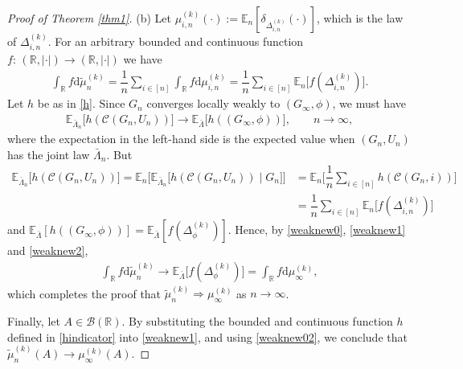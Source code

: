 \documentclass[11pt]{article}
\numberwithin{equation}{section}
\theoremstyle{plain}
\newcommand{\R}{\mathbb R}
\newcommand{\dd}{\mathrm{d}}
\newcommand{\weak}{\Longrightarrow}
\newcommand{\E}{\mathbb E}
\begin{document}
\begin{proof}[Proof of Theorem \ref{thm1}]
\medskip\noindent
(b) Let $\mu_{i,n}^{(k)}(\cdot):=\E_{n}[\delta_{\Delta_{i,n}^{(k)}}(\cdot)]$, which is the law of $\Delta_{i,n}^{(k)}$. For an arbitrary bounded and continuous function $f\colon\,(\R,\vert\cdot\vert) \to (\R,\vert\cdot\vert)$ we have
\begin{align}
\label{weaknew0}
\int_\R f \dd\tilde{\mu}_{n}^{(k)} = \dfrac{1}{n} \sum_{i \in [n]} \int_\R f \dd\mu_{i,n}^{(k)}
=\dfrac{1}{n}\sum_{i \in [n]} \E_{n}\big[f(\Delta_{i,n}^{(k)})\big].
\end{align}
Let $h$ be as in \eqref{h}. Since $G_{n}$ converges locally weakly to $(G_{\infty},\phi)$, we must have 
\begin{align}
\label{weaknew1}
\E_{\bar{\Lambda}_{n}}\big[h(\mathscr{C}(G_{n},U_{n}))\big] \to \E_{\bar{\Lambda}}\big[h((G_{\infty},\phi))\big],
\qquad n\to\infty,
\end{align}
where the expectation in the left-hand side is the expected value when $(G_{n},U_{n})$ has the joint law $\bar{\Lambda}_{n}$. But 
\begin{align}
\E_{\bar{\Lambda}_{n}}\big[h(\mathscr{C}(G_{n},U_{n}))\big] 
= \E_{n}\Big[\E_{\bar{\Lambda}_{n}}\big[h(\mathscr{C}(G_{n},U_{n}))\mid G_{n}\big]\Big]
&= \E_{n}\Big[\dfrac{1}{n}\sum_{i \in [n]}h(\mathscr{C}(G_{n},i))\Big] \label{weaknew02}\\
&=\dfrac{1}{n}\sum_{i \in [n]} \E_{n}\big[f(\Delta_{i,n}^{(k)})\big] \label{weaknew2}
\end{align}
and $\E_{\bar{\Lambda}}[h((G_{\infty},\phi))]=\E_{\bar{\Lambda}}[f(\Delta_{\phi}^{(k)})]$. Hence, by \eqref{weaknew0}, \eqref{weaknew1} and \eqref{weaknew2},
\begin{align*}
\int_\R f \dd\tilde{\mu}_{n}^{(k)} 
\to \E_{\bar{\Lambda}}\big[f(\Delta_{\phi}^{(k)})\big] = \int_\R f\dd \mu^{(k)}_{\infty},
\end{align*}
which completes the proof that $\tilde{\mu}_{n}^{(k)} \weak \mu^{(k)}_{\infty}$ as $n\to\infty$.

Finally, let $A\in\mathcal{B}(\R)$. By substituting the bounded and continuous function $h$ defined in \eqref{hindicator} into \eqref{weaknew1}, and using \eqref{weaknew02}, we conclude that $\tilde{\mu}_{n}^{(k)}(A)\to\mu^{(k)}_{\infty}(A)$.
\end{proof}

\end{document}
